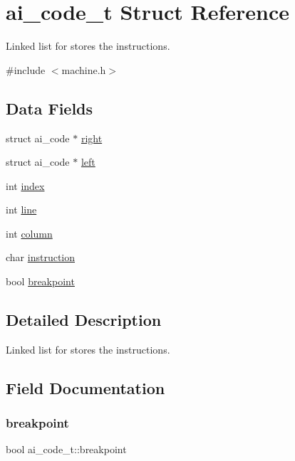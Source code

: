 \hypertarget{structai__code__t}{}\section{ai\+\_\+code\+\_\+t Struct Reference}
\label{structai__code__t}


Linked list for stores the instructions.  




{\ttfamily \#include $<$machine.\+h$>$}

\subsection*{Data Fields}
\begin{DoxyCompactItemize}
\item 
struct ai\+\_\+code $\ast$ \hyperlink{structai__code__t_a70f38fa9d58b3466eb324f5180971ab9}{right}
\item 
struct ai\+\_\+code $\ast$ \hyperlink{structai__code__t_aa8a13cde2bd2abb8cf099e05b754b3d1}{left}
\item 
int \hyperlink{structai__code__t_a0e9cedfb6ee5d16f6fc0effcb0e49f3c}{index}
\item 
int \hyperlink{structai__code__t_a0c317f27e8a3bb86a17ebadd8373b1f6}{line}
\item 
int \hyperlink{structai__code__t_ae38e27ea9f489fdac6b74e1a39eb0a6c}{column}
\item 
char \hyperlink{structai__code__t_a6d77dbac9ff028b9b6041ea451a5135a}{instruction}
\item 
bool \hyperlink{structai__code__t_a1d4e0a10154fbee929b1bc7974b74d67}{breakpoint}
\end{DoxyCompactItemize}


\subsection{Detailed Description}
Linked list for stores the instructions. 

\subsection{Field Documentation}
\mbox{\label{structai__code__t_a1d4e0a10154fbee929b1bc7974b74d67}} 
\subsubsection{\texorpdfstring{breakpoint}{breakpoint}}
{\footnotesize\ttfamily bool ai\+\_\+code\+\_\+t\+::breakpoint}

